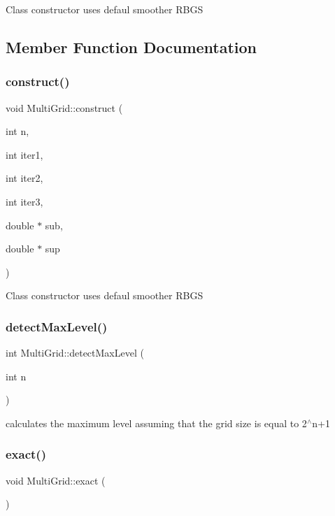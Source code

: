 Class constructor uses defaul smoother R\+B\+GS 

\subsection{Member Function Documentation}
\mbox{\label{classMultiGrid_aa63b0787973db9e19fa207b1be21a2d8}} 
\subsubsection{\texorpdfstring{construct()}{construct()}}
{\footnotesize\ttfamily void Multi\+Grid\+::construct (\begin{DoxyParamCaption}\item[{int}]{n,  }\item[{int}]{iter1,  }\item[{int}]{iter2,  }\item[{int}]{iter3,  }\item[{double $\ast$}]{sub,  }\item[{double $\ast$}]{sup }\end{DoxyParamCaption})}

Class constructor uses defaul smoother R\+B\+GS \mbox{\label{classMultiGrid_a0e184d70b17678ceb6707a8ddd7e6c87}} 
\subsubsection{\texorpdfstring{detect\+Max\+Level()}{detectMaxLevel()}}
{\footnotesize\ttfamily int Multi\+Grid\+::detect\+Max\+Level (\begin{DoxyParamCaption}\item[{int}]{n }\end{DoxyParamCaption})}

calculates the maximum level assuming that the grid size is equal to 2$^\wedge$n+1 \mbox{\label{classMultiGrid_a2c347faf3e1df3ec3dc30948550ec215}} 
\subsubsection{\texorpdfstring{exact()}{exact()}}
{\footnotesize\ttfamily void Multi\+Grid\+::exact (\begin{DoxyParamCaption}{ }\end{DoxyParamCaption})}

